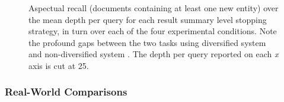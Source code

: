 \begin{figure}[t!]
    \centering
    \caption[Aspectual recall plots (diversification)]{Aspectual recall (documents containing at least one new entity) over the mean depth per query for each result summary level stopping strategy, in turn over each of the four experimental conditions. Note the profound gaps between the two tasks using diversified system  and non-diversified system . The depth per query reported on each \emph{x} axis is cut at 25.}
    \label{fig:ch8_sim_ar_plots}
\end{figure}

\subsubsection{Real-World Comparisons}

